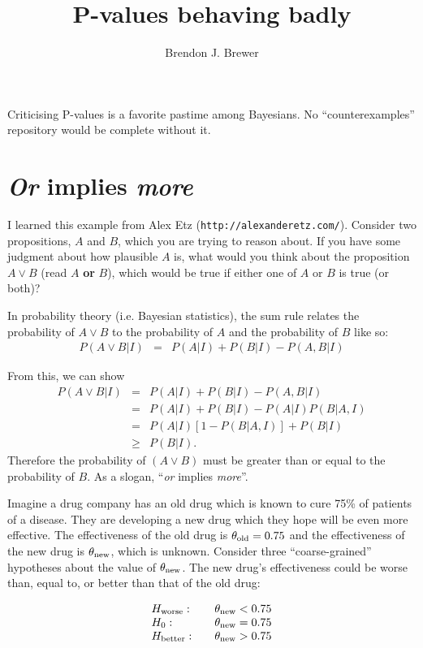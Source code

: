 \documentclass[a4paper, 12pt]{article}
\title{P-values behaving badly}
\author{Brendon J. Brewer}
\begin{document}
\maketitle

Criticising P-values is a favorite pastime among Bayesians. No
``counterexamples'' repository would be complete without it.

\section{{\em Or} implies {\em more}}
I learned this example from Alex Etz ({\tt http://alexanderetz.com/}).
Consider two propositions, $A$ and $B$, which you are trying to reason about.
If you have some judgment about how plausible $A$ is, what would you think
about the proposition $A \vee B$ (read $A$ {\bf or} $B$), which would be true
if either one of $A$ or $B$ is true (or both)? 

In probability theory (i.e. Bayesian statistics), the sum rule relates the
probability of $A \vee B$ to the probability of $A$ and the probability of
$B$ like so:
\begin{eqnarray}
P(A \vee B | I) &=& P(A | I) + P(B | I) - P(A, B | I)
\end{eqnarray}

From this, we can show
\begin{eqnarray}
P(A \vee B | I) &=& P(A | I) + P(B | I) - P(A, B | I)\\
                &=& P(A | I) + P(B | I) - P(A | I)P(B | A, I)\\
                &=& P(A | I)\left[1 - P(B | A,I)\right] + P(B | I)\\
                &\geq& P(B | I). 
\end{eqnarray}
Therefore the probability of $(A \vee B)$ must be greater than or equal to
the probability of $B$. As a slogan, ``{\em or} implies {\em more}''.


Imagine a drug company has an old drug which is known to cure
75\% of patients of a disease. They are developing a new drug
which they hope will be even more effective.
The effectiveness of the old drug is $\theta_{\rm old} = 0.75$ and the
effectiveness of the new drug is $\theta_{\rm new}$, which is unknown.
Consider three ``coarse-grained''
hypotheses about the value of $\theta_{\rm new}$. The new drug's
effectiveness could be worse than, equal to, or better than that of the old
drug:

\begin{equation}
\begin{array}{lcl}
H_{\rm worse}:  &  &\theta_{\rm new} < 0.75\\
H_0:            &  &\theta_{\rm new} = 0.75\\
H_{\rm better}: &  &\theta_{\rm new} > 0.75
\end{array}
\end{equation}
\end{document}
